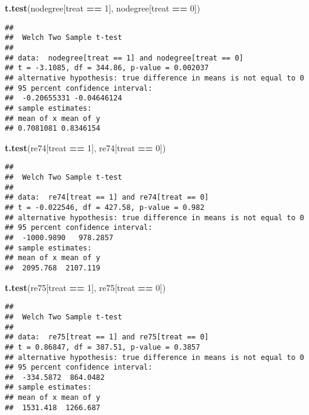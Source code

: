 \documentclass[
]{article}
\newenvironment{Shaded}{\begin{snugshade}}{\end{snugshade}}
\newcommand{\DecValTok}[1]{\textcolor[rgb]{0.00,0.00,0.81}{#1}}
\newcommand{\KeywordTok}[1]{\textcolor[rgb]{0.13,0.29,0.53}{\textbf{#1}}}
\newcommand{\NormalTok}[1]{#1}
\newcommand{\OperatorTok}[1]{\textcolor[rgb]{0.81,0.36,0.00}{\textbf{#1}}}
\newcommand{\StringTok}[1]{\textcolor[rgb]{0.31,0.60,0.02}{#1}}
\begin{document}
\begin{Shaded}
\begin{Highlighting}[]
\KeywordTok{t.test}\NormalTok{(nodegree[treat }\OperatorTok{==}\StringTok{ }\DecValTok{1}\NormalTok{], nodegree[treat }\OperatorTok{==}\StringTok{ }\DecValTok{0}\NormalTok{])}
\end{Highlighting}
\end{Shaded}

\begin{verbatim}
## 
##  Welch Two Sample t-test
## 
## data:  nodegree[treat == 1] and nodegree[treat == 0]
## t = -3.1085, df = 344.86, p-value = 0.002037
## alternative hypothesis: true difference in means is not equal to 0
## 95 percent confidence interval:
##  -0.20655331 -0.04646124
## sample estimates:
## mean of x mean of y 
## 0.7081081 0.8346154
\end{verbatim}

\begin{Shaded}
\begin{Highlighting}[]
\KeywordTok{t.test}\NormalTok{(re74[treat }\OperatorTok{==}\StringTok{ }\DecValTok{1}\NormalTok{], re74[treat }\OperatorTok{==}\StringTok{ }\DecValTok{0}\NormalTok{])}
\end{Highlighting}
\end{Shaded}

\begin{verbatim}
## 
##  Welch Two Sample t-test
## 
## data:  re74[treat == 1] and re74[treat == 0]
## t = -0.022546, df = 427.58, p-value = 0.982
## alternative hypothesis: true difference in means is not equal to 0
## 95 percent confidence interval:
##  -1000.9890   978.2857
## sample estimates:
## mean of x mean of y 
##  2095.768  2107.119
\end{verbatim}

\begin{Shaded}
\begin{Highlighting}[]
\KeywordTok{t.test}\NormalTok{(re75[treat }\OperatorTok{==}\StringTok{ }\DecValTok{1}\NormalTok{], re75[treat }\OperatorTok{==}\StringTok{ }\DecValTok{0}\NormalTok{])}
\end{Highlighting}
\end{Shaded}

\begin{verbatim}
## 
##  Welch Two Sample t-test
## 
## data:  re75[treat == 1] and re75[treat == 0]
## t = 0.86847, df = 387.51, p-value = 0.3857
## alternative hypothesis: true difference in means is not equal to 0
## 95 percent confidence interval:
##  -334.5872  864.0482
## sample estimates:
## mean of x mean of y 
##  1531.418  1266.687
\end{verbatim}
\end{document}

